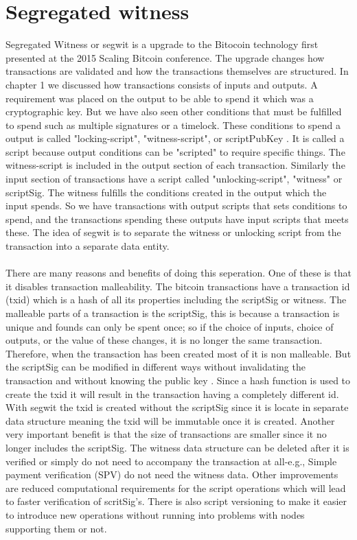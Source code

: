 \documentclass[informationsecurity]{gucmasterproject}
\begin{document}
\section{Segregated witness}
Segregated Witness or segwit is a upgrade to the Bitocoin technology first presented at the 2015 Scaling Bitcoin conference\cite{SB_segwit}. The upgrade changes how transactions are validated and how the transactions themselves are structured.
In chapter 1 we discussed how transactions consists of inputs and outputs. A requirement was placed on the output to be able to spend it which was a cryptographic key. But we have also seen other conditions that must be fulfilled to spend such as multiple signatures or a timelock. These conditions to spend a output is called "locking-script", "witness-script", or scriptPubKey \cite{antonopoulos2017mastering}. It is called a script because output conditions can be "scripted" to require specific things. The witness-script is included in the output section of each transaction. Similarly the input section of transactions have a script called "unlocking-script", "witness" or scriptSig. The witness fulfills the conditions created in the output which the input spends. So we have transactions with output scripts that sets conditions to spend, and the transactions spending these outputs have input scripts that meets these. The idea of segwit is to separate the witness or unlocking script from the transaction into a separate data entity. 

\paragraph{}
There are many reasons and benefits of doing this seperation\cite{antonopoulos2017mastering}\cite{BC_segwit}. One of these is that it disables transaction malleability. The bitcoin transactions have a transaction id (txid) which is a hash of all its properties including the scriptSig or witness. The malleable parts of a transaction is the scriptSig, this is because a transaction is unique and founds can only be spent once; so if the choice of inputs, choice of outputs, or the value of these changes, it is no longer the same transaction.
Therefore, when the transaction has been created most of it is non malleable. But the scriptSig can be modified in different ways without invalidating the transaction and without knowing the public key \cite{BIP62}. Since a hash function is used to create the txid it will result in the transaction having a completely different id. With segwit the txid is created without the scriptSig since it is locate in separate data structure meaning the txid will be immutable once it is created. Another very important benefit is that the size of transactions are smaller since it no longer includes the scriptSig. The witness data structure can be deleted after it is verified or simply do not need to accompany the transaction at all-e.g., Simple payment verification (SPV) do not need the witness data.
Other improvements are reduced computational requirements for the script operations which will lead to faster verification of scritSig's.
There is also script versioning to make it easier to introduce new operations without running into problems with nodes supporting them or not.
\end{document}
